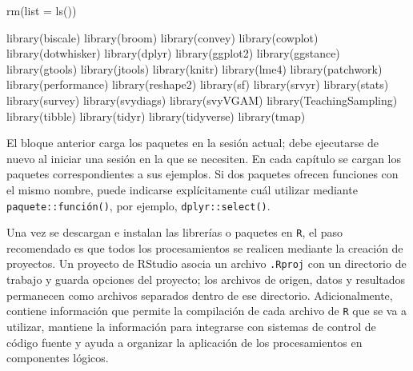 \documentclass[
  spanish,
  11pt,
  letterpaper,
  oneside,
  open=any]{scrbook}
\newenvironment{Shaded}{\begin{snugshade}}{\end{snugshade}}
\newcommand{\AttributeTok}[1]{\textcolor[rgb]{0.40,0.45,0.13}{#1}}
\newcommand{\FunctionTok}[1]{\textcolor[rgb]{0.28,0.35,0.67}{#1}}
\newcommand{\NormalTok}[1]{\textcolor[rgb]{0.00,0.23,0.31}{#1}}
\begin{document}
\begin{Shaded}
\begin{Highlighting}[]
\FunctionTok{rm}\NormalTok{(}\AttributeTok{list =} \FunctionTok{ls}\NormalTok{())}

\FunctionTok{library}\NormalTok{(biscale)}
\FunctionTok{library}\NormalTok{(broom)}
\FunctionTok{library}\NormalTok{(convey)}
\FunctionTok{library}\NormalTok{(cowplot)}
\FunctionTok{library}\NormalTok{(dotwhisker)}
\FunctionTok{library}\NormalTok{(dplyr)}
\FunctionTok{library}\NormalTok{(ggplot2)}
\FunctionTok{library}\NormalTok{(ggstance)}
\FunctionTok{library}\NormalTok{(gtools)}
\FunctionTok{library}\NormalTok{(jtools)}
\FunctionTok{library}\NormalTok{(knitr)}
\FunctionTok{library}\NormalTok{(lme4)}
\FunctionTok{library}\NormalTok{(patchwork)}
\FunctionTok{library}\NormalTok{(performance)}
\FunctionTok{library}\NormalTok{(reshape2)}
\FunctionTok{library}\NormalTok{(sf)}
\FunctionTok{library}\NormalTok{(srvyr)}
\FunctionTok{library}\NormalTok{(stats)}
\FunctionTok{library}\NormalTok{(survey)}
\FunctionTok{library}\NormalTok{(svydiags)}
\FunctionTok{library}\NormalTok{(svyVGAM)}
\FunctionTok{library}\NormalTok{(TeachingSampling)}
\FunctionTok{library}\NormalTok{(tibble)}
\FunctionTok{library}\NormalTok{(tidyr)}
\FunctionTok{library}\NormalTok{(tidyverse)}
\FunctionTok{library}\NormalTok{(tmap)}
\end{Highlighting}
\end{Shaded}

El bloque anterior carga los paquetes en la sesión actual; debe
ejecutarse de nuevo al iniciar una sesión en la que se necesiten. En
cada capítulo se cargan los paquetes correspondientes a sus ejemplos. Si
dos paquetes ofrecen funciones con el mismo nombre, puede indicarse
explícitamente cuál utilizar mediante \texttt{paquete::función()}, por
ejemplo, \texttt{dplyr::select()}.

Una vez se descargan e instalan las librerías o paquetes en \texttt{R},
el paso recomendado es que todos los procesamientos se realicen mediante
la creación de proyectos. Un proyecto de RStudio asocia un archivo
\texttt{.Rproj} con un directorio de trabajo y guarda opciones del
proyecto; los archivos de origen, datos y resultados permanecen como
archivos separados dentro de ese directorio. Adicionalmente, contiene
información que permite la compilación de cada archivo de \texttt{R} que
se va a utilizar, mantiene la información para integrarse con sistemas
de control de código fuente y ayuda a organizar la aplicación de los
procesamientos en componentes lógicos.
\end{document}
